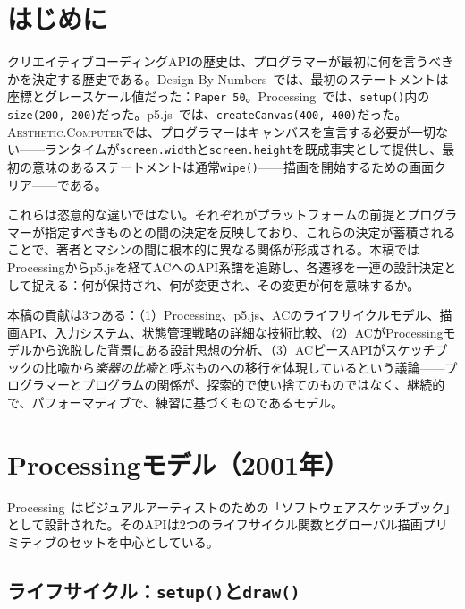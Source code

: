 \documentclass[10pt,letterpaper,twocolumn]{article}
\newcommand{\ac}{\textsc{Aesthetic.Computer}}
\begin{document}

\section{はじめに}

クリエイティブコーディングAPIの歴史は、プログラマーが最初に何を言うべきかを決定する歴史である。Design By Numbers~\citep{maeda2001dbn}では、最初のステートメントは座標とグレースケール値だった：\texttt{Paper 50}。Processing~\citep{reas2003processing}では、\texttt{setup()}内の\texttt{size(200, 200)}だった。p5.js~\citep{mccarthy2015p5js}では、\texttt{createCanvas(400, 400)}だった。\ac{}では、プログラマーはキャンバスを宣言する必要が一切ない——ランタイムが\texttt{screen.width}と\texttt{screen.height}を既成事実として提供し、最初の意味のあるステートメントは通常\texttt{wipe()}——描画を開始するための画面クリア——である。

これらは恣意的な違いではない。それぞれがプラットフォームの前提とプログラマーが指定すべきものとの間の決定を反映しており、これらの決定が蓄積されることで、著者とマシンの間に根本的に異なる関係が形成される。本稿ではProcessingからp5.jsを経てACへのAPI系譜を追跡し、各遷移を一連の設計決定として捉える：何が保持され、何が変更され、その変更が何を意味するか。

本稿の貢献は3つある：（1）Processing、p5.js、ACのライフサイクルモデル、描画API、入力システム、状態管理戦略の詳細な技術比較、（2）ACがProcessingモデルから逸脱した背景にある設計思想の分析、（3）ACピースAPIがスケッチブックの比喩から\emph{楽器の比喩}と呼ぶものへの移行を体現しているという議論——プログラマーとプログラムの関係が、探索的で使い捨てのものではなく、継続的で、パフォーマティブで、練習に基づくものであるモデル。


\section{Processingモデル（2001年）}
\label{sec:processing}

Processing~\citep{reas2007processing}はビジュアルアーティストのための「ソフトウェアスケッチブック」として設計された。そのAPIは2つのライフサイクル関数とグローバル描画プリミティブのセットを中心としている。

\subsection{ライフサイクル：\texttt{setup()}と\texttt{draw()}}
\end{document}
